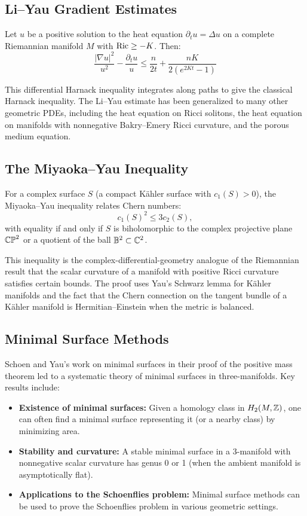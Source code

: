 \subsection{Li--Yau Gradient Estimates}

\begin{theorem}[Li--Yau, 1986]
Let $u$ be a positive solution to the heat equation $\partial_t u = \Delta u$ on a complete Riemannian manifold $M$ with $\operatorname{Ric} \geq -K$. Then:
\[
\frac{|\nabla u|^2}{u^2} - \frac{\partial_t u}{u} \leq \frac{n}{2t} + \frac{nK}{2(e^{2Kt} - 1)}
\]
\end{theorem}

This differential Harnack inequality integrates along paths to give the classical Harnack inequality. The Li--Yau estimate has been generalized to many other geometric PDEs, including the heat equation on Ricci solitons, the heat equation on manifolds with nonnegative Bakry--Emery Ricci curvature, and the porous medium equation.

\subsection{The Miyaoka--Yau Inequality}

For a complex surface $S$ (a compact K\"ahler surface with $c_1(S) > 0$), the Miyaoka--Yau inequality relates Chern numbers:
\[
c_1(S)^2 \leq 3 c_2(S),
\]
with equality if and only if $S$ is biholomorphic to the complex projective plane $\mathbb{CP}^2$ or a quotient of the ball $\mathbb{B}^2 \subset \mathbb{C}^2$.

This inequality is the complex-differential-geometry analogue of the Riemannian result that the scalar curvature of a manifold with positive Ricci curvature satisfies certain bounds. The proof uses Yau's Schwarz lemma for K\"ahler manifolds and the fact that the Chern connection on the tangent bundle of a K\"ahler manifold is Hermitian--Einstein when the metric is balanced.

\subsection{Minimal Surface Methods}

Schoen and Yau's work on minimal surfaces in their proof of the positive mass theorem led to a systematic theory of minimal surfaces in three-manifolds. Key results include:
\begin{itemize}
    \item \textbf{Existence of minimal surfaces:} Given a homology class in $H_2(M, \mathbb{Z})$, one can often find a minimal surface representing it (or a nearby class) by minimizing area.
    \item \textbf{Stability and curvature:} A stable minimal surface in a 3-manifold with nonnegative scalar curvature has genus 0 or 1 (when the ambient manifold is asymptotically flat).
    \item \textbf{Applications to the Schoenflies problem:} Minimal surface methods can be used to prove the Schoenflies problem in various geometric settings.
\end{itemize}

